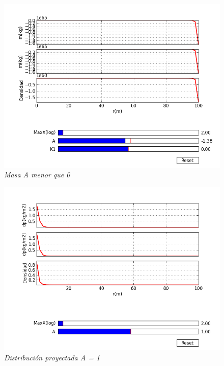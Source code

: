 \documentclass[12pt]{book}
\begin{document}
\begin{figure}[!h]
 \centering
 \includegraphics[scale=0.7]{masa3.png}
 \caption{\emph{Masa A menor que 0}}
 \label{Fig: 1}
\end{figure}



\begin{figure}[!h]
 \centering
 \includegraphics[scale=0.7]{dp1.png}
 \caption{\emph{Distribución proyectada A = 1}}
 \label{Fig: 1}
\end{figure}
\end{document}
